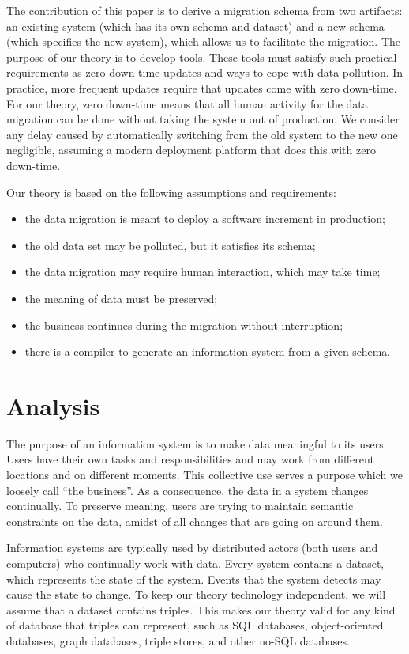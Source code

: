 \documentclass{elsarticle}
\begin{document}
   The contribution of this paper is to derive a migration schema from two artifacts: an existing system
   (which has its own schema and dataset) and a new schema (which specifies the new system),
   which allows us to facilitate the migration.
   The purpose of our theory is to develop tools.
   These tools must satisfy such practical requirements as
   zero down-time updates and ways to cope with data pollution.
   In practice, more frequent updates require that updates come with zero down-time.
   For our theory, zero down-time means that all human activity for the data migration can be done without taking the system out of production.
   We consider any delay caused by automatically switching from the old system to the new one negligible,
   assuming a modern deployment platform that does this with zero down-time.
   
   Our theory is based on the following assumptions and requirements:
\begin{itemize}
   \item the data migration is meant to deploy a software increment in production;
   \item the old data set may be polluted, but it satisfies its schema;
   \item the data migration may require human interaction, which may take time;
   \item the meaning of data must be preserved;
   \item the business continues during the migration without interruption;
   \item there is a compiler to generate an information system from a given schema.
\end{itemize}


\section{Analysis}
   The purpose of an information system is to make data meaningful to its users.
   Users have their own tasks and responsibilities
   and may work from different locations and on different moments.
   This collective use serves a purpose which we loosely call ``the business''.
   As a consequence, the data in a system changes continually.
   To preserve meaning, users are trying to maintain semantic constraints on the data,
   amidst of all changes that are going on around them.

   Information systems are typically used by distributed actors (both users and computers) who continually work with data.
   Every system contains a dataset, which represents the state of the system.
   Events that the system detects may cause the state to change.
   To keep our theory technology independent, we will assume that a dataset contains triples.
   This makes our theory valid for any kind of database that triples can represent,
   such as SQL databases, object-oriented databases, graph databases, triple stores, and other no-SQL databases.
\end{document}
